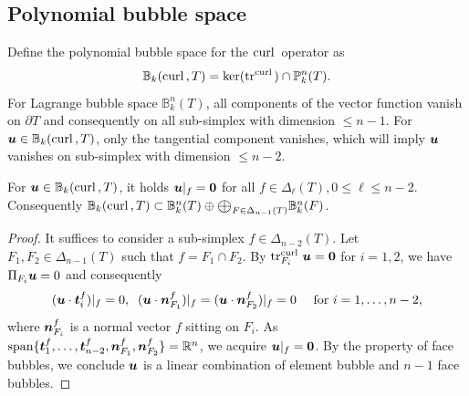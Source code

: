 \documentclass[mathpazo]{cicp}
\newcommand{\Oplus}{\ensuremath{\vcenter{\hbox{\scalebox{1.5}{$\oplus$}}}}}
\begin{document}
\subsection{Polynomial bubble space}
Define the polynomial bubble space for the ${\rm curl\,}$ operator as
$$
\mathbb B_k({\rm curl\,}, T) = \ker(\operatorname{tr}^{{\rm curl\,}})\cap \mathbb P_k^n(T).
$$
For Lagrange bubble space $\mathbb B_k^n(T)$, all components of the vector function vanish on $\partial T$ and consequently on all sub-simplex with dimension $\leq n-1$. For $\boldsymbol u \in \mathbb B_k({\rm curl\,}, T)$, only the tangential component vanishes, which will imply $\boldsymbol u$ vanishes on sub-simplex with dimension $\leq n-2$. 

\begin{lemma}\label{lm:curlbubbleface}
For $\boldsymbol u\in \mathbb B_k({\rm curl\,}, T)$, it holds $\boldsymbol u|_f=\boldsymbol0$ for all $f\in\Delta_{\ell}(T), 0\leq \ell\leq n-2$. Consequently $\mathbb B_k(\curl, T)\subset \mathbb B_k^n(T) \oplus\Oplus_{F\in \Delta_{n-1}(T)}  \mathbb B_k^{n}(F)$.
\end{lemma}
\begin{proof}
It suffices to consider a sub-simplex $f\in \Delta_{n-2}(T)$. Let $F_1, F_2\in\Delta_{n-1}(T)$ such that $f=F_1\cap F_2$. By $\operatorname{tr}_{F_i}^{{\rm curl\,}}\boldsymbol u=\boldsymbol0$ for $i=1,2$, we have $\Pi_{F_i}\boldsymbol u = 0$ and consequently
$$
(\boldsymbol u\cdot\boldsymbol t_i^f)|_f=0, \;\; (\boldsymbol u\cdot\boldsymbol n_{F_1}^f)|_f=(\boldsymbol u\cdot\boldsymbol n_{F_2}^f)|_f=0\quad \textrm{ for } i=1,\ldots, n-2,
$$
where $\boldsymbol n_{F_i}^f$ is a normal vector $f$ sitting on $F_i$. As $\operatorname*{span} \{\boldsymbol t_1^f, \ldots, \boldsymbol t_{n-2}^f, \boldsymbol n_{F_1}^f, \boldsymbol n_{F_2}^f \} = \mathbb R^n$, we acquire $\boldsymbol u|_f=\boldsymbol0$. By the property of face bubbles, we conclude $\boldsymbol u$ is a linear combination of element bubble and $n-1$ face bubbles. 
\end{proof}
\end{document}

